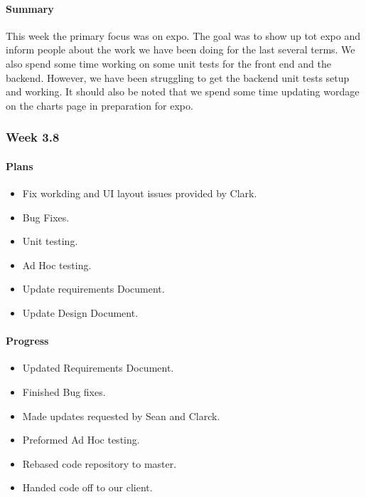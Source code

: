 \documentclass[onecolumn, draftclsnofoot,10pt, compsoc]{article}
\begin{document}
		    \paragraph{Summary} \hfill \break
		    This week the primary focus was on expo. The goal was to show up tot expo and inform people about the work we have been doing for the last several terms. We also spend some time working on some unit tests for the front end and the backend. However, we have been struggling to get the backend unit tests setup and working. It should also be noted that we spend some time updating wordage on the charts page in preparation for expo.\\

		\subsubsection{Week 3.8}
		    \paragraph{Plans} \hfill \break
		        \begin{itemize}
		            \item Fix workding and UI layout issues provided by Clark.\\
		            \item Bug Fixes.\\
		            \item Unit testing.\\
		            \item Ad Hoc testing.\\
		            \item Update requirements Document.\\
		            \item Update Design Document.\\
		        \end{itemize}
		    \paragraph{Progress} \hfill \break
		        \begin{itemize}
		            \item Updated Requirements Document.\\
		            \item Finished Bug fixes.\\
		            \item Made updates requested by Sean and Clarck.\\
		            \item Preformed Ad Hoc testing.\\
		            \item Rebased code repository to master.
		            \item Handed code off to our client.\\
		        \end{itemize}
\end{document}
